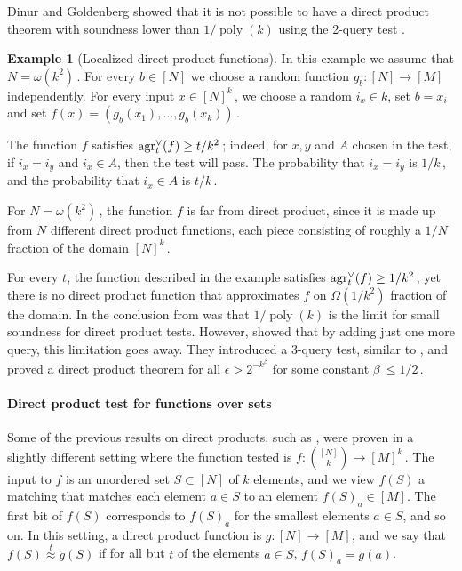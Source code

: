\documentclass[11pt]{article}
\numberwithin{equation}{section}
\theoremstyle{definition}
\newtheorem{example}[theorem]{Example}
\theoremstyle{plain}
\DeclareMathOperator{\poly}{poly} %
\newcommand\f{f} %
\newcommand\pf{g} %
\newcommand{\test}[2]{
	\ifx &#2&
	\textrm{agr}^{#1}
	\else	
	\textrm{agr}^{#1}_{#2}
	\fi}
\newcommand\neql[1]{\stackrel{{#1}}{ \approx}} %
\begin{document}
Dinur and Goldenberg showed that it is not possible to have a direct product theorem with soundness lower than 
%
$1/\poly(k)$ %
 using the 2-query test \cite{dinur2008locally}.
\begin{example}[Localized direct product functions]\label{ex:mult DP func}
In this example we %
%
%
%
%
%
%
assume that $N =\omega(k^2)$\,. %
For every $b\in [N]$ we choose a random function $\pf_b:[N]\rightarrow[M]$ independently. For every input $x\in[N]^k$\,, we choose a random $i_x\in k$, set $b=x_i$ and set $\f(x)= (\pf_{b}(x_1),\ldots,\pf_{b}(x_k) )$\,.
	
	The function $\f$ satisfies $\test{\vee}{t}(f) \geq 
t/k^2$\,; %
indeed, for $x,y$ and $A$ chosen in the test, if $i_x=i_y$ and $i_x\in A$, then the test will pass. The probability that $i_x=i_y$ is 
$1/k$\,, and the probability that $i_x\in A$ is $t/k$\,. %
	
%
For $N=\omega(k^2)$\,, the function $\f$ is %
far from direct product, since it 
is made up from $N$ different direct product
%
%
%
functions, each        
piece consisting of roughly
a  %
$1/N$ fraction of the domain $[N]^k$\,.
\end{example}
For every $t$, the function described in the example satisfies $\test{\vee}{t}(f)\geq
%
%
1/k^2$\,, %
yet there is no direct product function that approximates $f$ 
%
on $\Omega(1/k^2)$ fraction of the domain. %
In \cite{dinur2008locally} the conclusion from  was that $1/\poly(k)$ is the limit for small soundness for direct product tests. However, \cite{impagliazzo2012new} showed that by adding just one more query, this limitation goes away. They introduced a 3-query test, similar to , and proved a direct product theorem for all $\epsilon>2^{-k^\beta}$ for some constant $\beta\ \le 1/2$\,.

\paragraph*{Direct product test for functions over sets}
Some of the previous %
%
%
results on direct products,  %
such as \cite{impagliazzo2012new}, were proven in a slightly different setting where the function tested is $\f:\binom{[N]}{k}\rightarrow [M]^k$\,. The input to $\f$ is an unordered set $S\subset [N]$ of $k$ elements, and we view $\f(S)$ a matching that matches each element $a\in S$ to an element $f(S)_a\in [M]$.
%
%
The first bit of $f(S)$ corresponds to $f(S)_a$ for the smallest elements $a\in S$, and so on. %
In this setting, a direct product function is $\pf:[N]\rightarrow [M]$, and we say that $\f(S)\neql{t}\pf(S)$ if for all
%
but  %
$t$ of the elements $a\in S$, $\f(S)_a = \pf(a)$.
\end{document}
